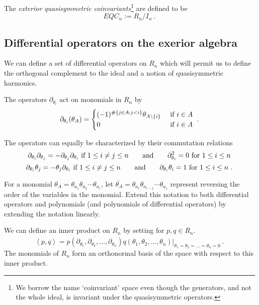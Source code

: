 \documentclass[11pt]{amsart}
\theoremstyle{definition}
\numberwithin{equation}{section}
\begin{document}
The \emph{exterior quasisymmetric coinvariants}\footnote{We borrow
the name `coinvariant' space even though the generators, and not the whole ideal, is
invariant under the quasisymmetric operators.} are defined to be
\[
EQC_n := R_n/I_n~.
\]


\subsection{Differential operators on the exerior algebra}\label{ssec:harm}
We can define a set of differential operators on $R_n$ which
will permit us to define the orthogonal complement to the
ideal and a notion of quasisymmetric harmonics.

The operators $\partial_{\theta_i}$ act on monomials in $R_n$
by
\[
\partial_{\theta_i}( \theta_A ) = \begin{cases}
(-1)^{\#\{ j \in A: j<i\}}\theta_{A \backslash \{i\}}&\hbox{ if }i \in A\\
0&\hbox{ if }i \in A
\end{cases}~.
\]

The operators can equally be characterized by their commutation
relations
\[
\partial_{\theta_i} \partial_{\theta_j}=-\partial_{\theta_j} \partial_{\theta_i}
\hbox{ if } 1 \leq i \neq j \leq n
\qquad\hbox{and}\qquad
\partial_{\theta_i}^2 = 0\hbox{ for }1 \leq i \leq n
\]
\[
\partial_{\theta_i} \theta_j=-\theta_j \partial_{\theta_i}
\hbox{ if } 1 \leq i \neq j \leq n
\qquad\hbox{and}\qquad
\partial_{\theta_i} \theta_i = 1\hbox{ for }1 \leq i \leq n~.
\]

For a monomial $\theta_A = \theta_{a_1} \theta_{a_2} \cdots \theta_{a_r}$,
let $\overline{\theta_A} = \theta_{a_r} \theta_{a_{r-1}} \cdots \theta_{a_1}$ represent
reversing the order of the variables in the monomial.  Extend this notation to both
differential operators and polynomials (and polynomials of differential operators)
by extending the notation linearly.

We can define an inner product on $R_n$ by setting for $p,q \in R_n$.
\[
\left< p, q \right> = \overline{p(\partial_{\theta_1}, \partial_{\theta_2}, \ldots, \partial_{\theta_n})}
q( \theta_1, \theta_2, \ldots, \theta_n)|_{\theta_1=\theta_2 = \ldots=\theta_n=0}~.
\]
The monomials of $R_n$ form an orthonormal basis of the space with respect to this
inner product.
\end{document}

